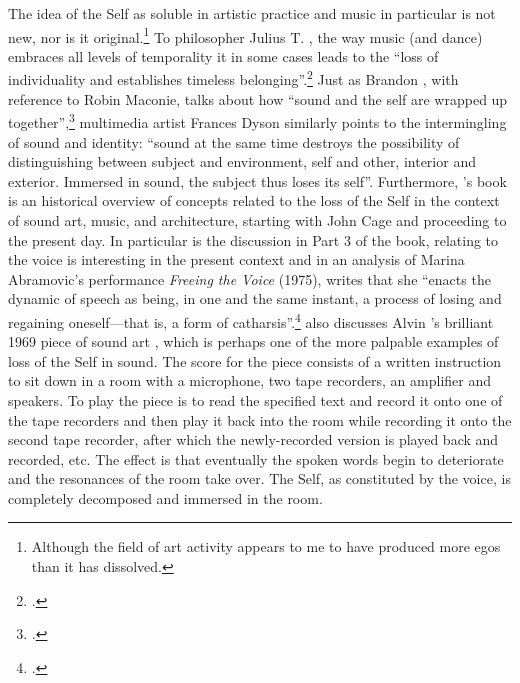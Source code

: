 The idea of the Self as soluble in artistic practice and music in particular is not new, nor is it original.\footnote{Although the field of art activity appears to me to have produced more egos than it has dissolved.} To philosopher Julius T. \citeauthor{fraser90}, the way music (and dance) embraces all levels of temporality it in some cases leads to the ``loss of individuality and establishes timeless belonging''.\footcite[410-1]{fraser90} Just as Brandon \citeauthor{labelle06}, with reference to Robin Maconie, talks about how ``sound and the self are wrapped up together'',\footcite[62]{labelle06} multimedia artist Frances Dyson similarly points to the intermingling of sound and identity: ``sound at the same time destroys the possibility of distinguishing between subject and environment, self and other, interior and exterior. Immersed in sound, the subject thus loses its self''. Furthermore, \citeauthor{labelle06}'s book  is an historical overview of concepts related to the loss of the Self in the context of sound art, music, and architecture, starting with John Cage and proceeding to the present day. In particular is the discussion in Part 3 of the book, relating to the voice is interesting in the present context and in an analysis of Marina Abramovic's performance \emph{Freeing the Voice} (1975), \citeauthor{labelle06} writes that she ``enacts the dynamic of speech as being, in one and the same instant, a process of losing and regaining oneself---that is, a form of catharsis''.\footcite[103]{labelle06} \citeauthor{labelle06} also discusses Alvin \citeauthor{lucier69}'s brilliant 1969 piece of sound art , which is perhaps one of the more palpable examples of loss of the Self in sound. The score for the piece consists of a written instruction to sit down in a room with a microphone, two tape recorders, an amplifier and speakers. To play the piece is to read the specified text and record it onto one of the tape recorders and then play it back into the room while recording it onto the second tape recorder, after which the newly-recorded version is played back and recorded, etc. The effect is that eventually the spoken words begin to deteriorate and the resonances of the room take over. The Self, as constituted by the voice, is completely decomposed and immersed in the room.

